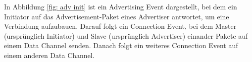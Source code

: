 In Abbildung \ref{fig: adv init} ist ein Advertising Event dargestellt, bei dem ein Initiator auf das Advertisement-Paket eines Advertiser antwortet, um eine Verbindung aufzubauen. Darauf folgt ein Connection Event, bei dem Master (ursprünglich Initiator) und Slave (ursprünglich Advertiser) einander Pakete auf einem Data Channel senden. Danach folgt ein weiteres Connection Event auf einem anderen Data Channel.